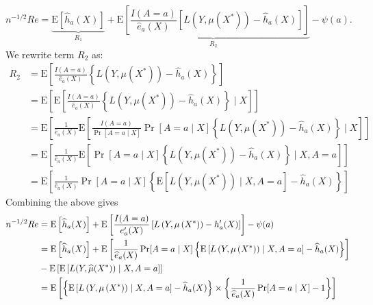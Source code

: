 $$
n^{-1 / 2} Re=
\underbrace{\mathrm{E}\left[\widehat{h}_a(X)\right]}_{R_1}+\underbrace{\mathrm{E}\left[\frac{I(A = a)}{\widehat{e}_a(X)}\left[L\left(Y, \mu\left(X^*\right)\right)-\widehat{h}_a(X)\right]\right]}_{R_2}-\psi(a).
$$
We rewrite term $R_2$ as:
$$
\begin{aligned}
R_2 & =\mathrm{E}\left[\frac{ I(A=a)}{\widehat{e}_a(X)}\left\{L\left(Y, \mu\left(X^*\right)\right)-\widehat{h}_a(X)\right\}\right] \\
& =\mathrm{E}\left[\mathrm{E}\left[\frac{ I(A=a)}{\widehat{e}_a(X)}\left\{L\left(Y, \mu\left(X^*\right)\right)-\widehat{h}_a(X)\right\} \mid X\right]\right] \\
& =\mathrm{E}\left[\frac{1}{\widehat{e}_a(X)} \mathrm{E}\left[\frac{I(A=a)}{\operatorname{Pr}[A=a \mid X]} \operatorname{Pr}[A=a \mid X]\left\{L\left(Y, \mu\left(X^*\right)\right)-\widehat{h}_a(X)\right\} \mid X\right]\right] \\
& =\mathrm{E}\left[\frac{1}{\widehat{e}_a(X)} \mathrm{E}\left[\operatorname{Pr}[A=a \mid X]\left\{L\left(Y, \mu\left(X^*\right)\right)-\widehat{h}_a(X)\right\} \mid X, A=a\right]\right] \\
& =\mathrm{E}\left[\frac{1}{\widehat{e}_a(X)} \operatorname{Pr}[A=a \mid X]\left\{\mathrm{E}\left[L\left(Y, \mu\left(X^*\right)\right) \mid X, A=a\right]-\widehat{h}_a(X)\right\}\right]
\end{aligned}
$$
Combining the above gives
$$
\begin{aligned}
n^{-1 / 2} R e & =\mathrm{E}\left[\widehat{h}_a(X)\right]+\mathrm{E}\left[\frac{I(A = a)}{e_a^{\prime}(X)}\left[L\left(Y, \mu\left(X^*\right)\right)-h_a^{\prime}(X)\right]\right]-\psi(a) \\
& =\mathrm{E}\left[\widehat{h}_a(X)\right]+\mathrm{E}\left[\frac{1}{\widehat{e}_a(X)} \operatorname{Pr}[A=a \mid X]\left\{\mathrm{E}\left[L\left(Y, \mu\left(X^*\right)\right) \mid X, A=a\right]-\widehat{h}_a(X)\right\}\right] \\ 
&- \operatorname{E}\left[\operatorname{E}\left[L(Y, \widehat{\mu}(X^*))\mid X, A = a\right]\right]\\
& =\operatorname{E}\left[\left\{\mathrm{E}\left[L\left(Y, \mu\left(X^*\right)\right) \mid X, A=a\right]-\widehat{h}_a(X)\right\}\times\left\{\frac{1}{\widehat{e}_a(X)} \operatorname{Pr}[A=a \mid X]-1\right\}\right]
\end{aligned}
$$
